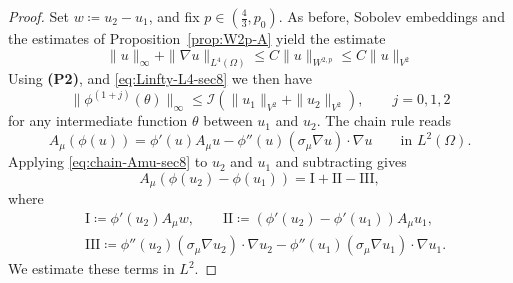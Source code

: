 \documentclass[10pt,a4paper]{amsart}
\begin{document}
\begin{proof}
Set $w\coloneqq u_2-u_1$, and fix $p\in (\frac43,p_0)$. As before, Sobolev embeddings and  the estimates of Proposition~\ref{prop:W2p-A}   
yield the estimate 
\begin{equation}\label{eq:Linfty-L4-sec8}
\|u\|_{\infty}+\|\nabla u\|_{L^4(\Omega)}\le C\|u\|_{W^{2,p}}\le C\|u\|_{{V^2}}
\end{equation}
Using \textbf{(P2)}, and \eqref{eq:Linfty-L4-sec8} we then have 
\begin{equation}\label{eq:phi-derivs-bdd-sec8}
\|\phi^{(1+j)}(\theta)\|_{\infty}\le \mathcal I(\|u_1\|_{{V^2}}+ \|u_2\|_{{V^2}}), \qquad j=0,1,2\end{equation}
for any intermediate function $\theta$ between $u_1$ and $u_2$.
The chain rule reads
\begin{equation}\label{eq:chain-Amu-sec8}
A_\mu(\phi(u))=\phi'(u)A_\mu u-\phi''(u)(\sigma_\mu\nabla u)\cdot\nabla u
\qquad\text{in }L^2(\Omega).
\end{equation}
Applying \eqref{eq:chain-Amu-sec8} to $u_2$ and $u_1$ and subtracting gives
\[
A_\mu(\phi(u_2)-\phi(u_1))=\mathrm{I}+\mathrm{II}-\mathrm{III},
\]
where
\[
\begin{split}&
\mathrm{I}\coloneqq \phi'(u_2)A_\mu w,
\qquad
\mathrm{II}\coloneqq \left(\phi'(u_2)-\phi'(u_1)\right)A_\mu u_1,
\\
&
\mathrm{III}\coloneqq
\phi''(u_2)(\sigma_\mu\nabla u_2)\cdot\nabla u_2
-\phi''(u_1)(\sigma_\mu\nabla u_1)\cdot\nabla u_1.
\end{split}
\]
We estimate these terms in $L^2$.


\end{proof}
\end{document}
